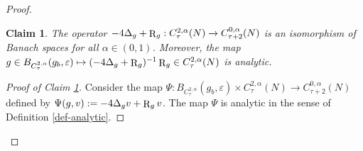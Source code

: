 \documentclass[a4paper,11pt,reqno]{amsart}
\newtheorem{claim}{Claim}
\def\R{\mathop{\rm R}\nolimits}
\numberwithin{equation}{section}
\begin{document}
\begin{proof}
		\begin{claim}\label{claim-iso}
			The operator $-4\Delta_g+\R_g: C^{2,\alpha}_{\tau}(N)\rightarrow C^{0,\alpha}_{\tau+2}(N)$ is an isomorphism of Banach spaces for all $\alpha\in(0,1)$. Moreover, the map $g\in B_{C^{2,\alpha}_{\tau}}(g_b,\varepsilon)\mapsto (-4\Delta_g+\R_g)^{-1}\R_g \in C^{2,\alpha}_{\tau}(N) $ is analytic.
			
		\end{claim}
		\begin{proof}[Proof of Claim \ref{claim-iso}]
			Consider the map $\Psi:B_{C^{2,\alpha}_{\tau}}(g_b,\varepsilon)\times C^{2,\alpha}_{\tau}(N)\rightarrow C^{0,\alpha}_{\tau+2}(N)$ defined by $\Psi(g,v):=-4\Delta_gv+\R_gv$. The map $\Psi$ is analytic in the sense of Definition \ref{def-analytic}.
			

\end{proof}
\end{proof}
\end{document}
